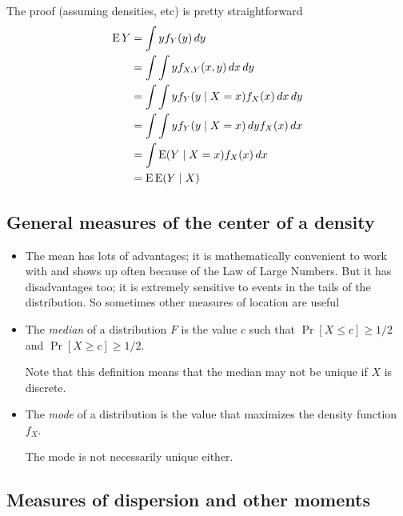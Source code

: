 \begin{itemize}[leftmargin=0pt]
\begin{enumerate}
\begin{thm}
    \end{thm}
    The proof (assuming densities, etc) is pretty straightforward
    \begin{align*}
      \operatorname{E} Y &= \int y f_Y(y) \,dy \\
      &= \int \int y f_{X,Y}(x,y) \,dx \,dy \\
      &= \int \int y f_Y(y \mid X = x) f_X(x) \,dx \,dy \\
      &= \int \int y f_Y(y \mid X = x) \,dy f_X(x) \,dx \\
      &= \int \operatorname{E}(Y \mid X = x) f_X(x) \,dx \\
      &= \operatorname{E} \operatorname{E}(Y \mid X)
    \end{align*}
  \end{enumerate}

\end{itemize}

\subsection{General measures of the center of a density}

\begin{itemize}[leftmargin=0pt]

\item The mean has lots of advantages; it is mathematically convenient
  to work with and shows up often because of the Law of Large Numbers.
  But it has disadvantages too; it is extremely sensitive to events in
  the tails of the distribution.  So sometimes other measures of
  location are useful

\item %
  \begin{defn}
    The \emph{median} of a distribution $F$ is the value $c$ such that
    $\Pr[X \leq c] \geq 1/2$ and $\Pr[X \geq c] \geq 1/2$.
  \end{defn}
  Note that this definition means that the median may not be unique if
  $X$ is discrete.

\item %
  \begin{defn}
    The \emph{mode} of a distribution is the value that maximizes
    the density function $f_X$.
  \end{defn}
  The mode is not necessarily unique either.

\end{itemize}

\subsection{Measures of dispersion and other moments}

